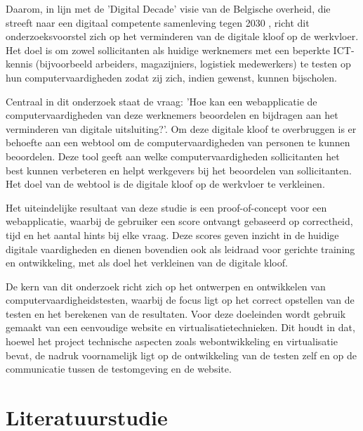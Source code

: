 Daarom, in lijn met de 'Digital Decade' visie van de Belgische overheid, die streeft naar een digitaal competente samenleving tegen 2030 \autocite{DigitalDecade2030}, richt dit onderzoeksvoorstel zich op het verminderen van de digitale kloof op de werkvloer. Het doel is om zowel sollicitanten als huidige werknemers met een beperkte ICT-kennis (bijvoorbeeld arbeiders, magazijniers, logistiek medewerkers) te testen op hun computervaardigheden zodat zij zich, indien gewenst, kunnen bijscholen.

Centraal in dit onderzoek staat de vraag: 'Hoe kan een webapplicatie de computervaardigheden van deze werknemers beoordelen en bijdragen aan het verminderen van digitale uitsluiting?'. Om deze digitale kloof te overbruggen is er behoefte aan een webtool om de computervaardigheden van personen te kunnen beoordelen.
Deze tool geeft aan welke computervaardigheden sollicitanten het best kunnen verbeteren en helpt werkgevers bij het beoordelen van sollicitanten. Het doel van de webtool is de digitale kloof op de werkvloer te verkleinen.

Het uiteindelijke resultaat van deze studie is een proof-of-concept voor een webapplicatie, wa\-arbij de gebruiker een score ontvangt gebaseerd op correctheid, tijd en het aantal hints bij elke vraag. Deze scores geven inzicht in de huidige digitale vaardigheden en dienen bovendien ook als leidraad voor gerichte training en ontwikkeling, met als doel het verkleinen van de digitale kloof.

De kern van dit onderzoek richt zich op het ontwerpen en ontwikkelen van computervaardigheidstesten, waarbij de focus ligt op het correct opstellen van de testen en het berekenen van de resultaten. Voor deze doeleinden wordt gebruik gemaakt van een eenvoudige website en virtualisatietechnieken. Dit houdt in dat, hoewel het project technische aspecten zoals webontwikkeling en virtualisatie bevat, de nadruk voornamelijk ligt op de ontwikkeling van de testen zelf en op de communicatie tussen de testomgeving en de website.


\section{Literatuurstudie}%
\label{sec:state-of-the-art}


